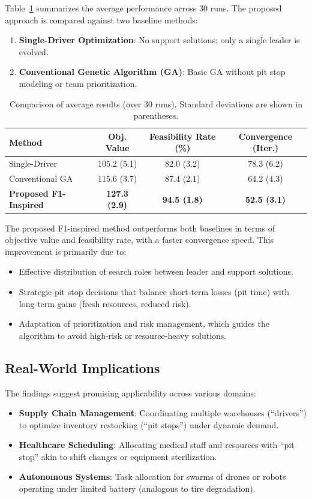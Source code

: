 \documentclass[preprint,12pt]{elsarticle}
\begin{document}
Table~\ref{tab:results} summarizes the average performance across 30 runs. The proposed approach is compared against two baseline methods:
\begin{enumerate}
    \item \textbf{Single-Driver Optimization}: No support solutions; only a single leader is evolved.
    \item \textbf{Conventional Genetic Algorithm (GA)}: Basic GA without pit stop modeling or team prioritization.
\end{enumerate}

\begin{table}[!ht]
\centering
\caption{Comparison of average results (over 30 runs). Standard deviations are shown in parentheses.}
\label{tab:results}
\begin{tabular}{lccc}
\toprule
\textbf{Method} & \textbf{Obj. Value} & \textbf{Feasibility Rate (\%)} & \textbf{Convergence (Iter.)}\\
\midrule
Single-Driver         & 105.2 (5.1) & 82.0 (3.2) & 78.3 (6.2) \\
Conventional GA       & 115.6 (3.7) & 87.4 (2.1) & 64.2 (4.3) \\
\textbf{Proposed F1-Inspired} & \textbf{127.3 (2.9)} & \textbf{94.5 (1.8)} & \textbf{52.5 (3.1)} \\
\bottomrule
\end{tabular}
\end{table}

The proposed F1-inspired method outperforms both baselines in terms of objective value and feasibility rate, with a faster convergence speed. This improvement is primarily due to:
\begin{itemize}
    \item Effective distribution of search roles between leader and support solutions.
    \item Strategic pit stop decisions that balance short-term losses (pit time) with long-term gains (fresh resources, reduced risk).
    \item Adaptation of prioritization and risk management, which guides the algorithm to avoid high-risk or resource-heavy solutions.
\end{itemize}

\subsection{Real-World Implications}

The findings suggest promising applicability across various domains:
\begin{itemize}
    \item \textbf{Supply Chain Management}: Coordinating multiple warehouses (“drivers”) to optimize inventory restocking (“pit stops”) under dynamic demand.
    \item \textbf{Healthcare Scheduling}: Allocating medical staff and resources with “pit stop” akin to shift changes or equipment sterilization.
    \item \textbf{Autonomous Systems}: Task allocation for swarms of drones or robots operating under limited battery (analogous to tire degradation).
\end{itemize}
\end{document}
